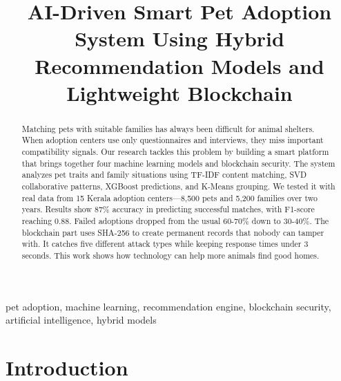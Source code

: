 \documentclass[conference]{IEEEtran}
\begin{document}
\title{AI-Driven Smart Pet Adoption System Using Hybrid Recommendation Models and Lightweight Blockchain}

\author{
\and
{}
}

\maketitle

\begin{abstract}
Matching pets with suitable families has always been difficult for animal shelters. When adoption centers use only questionnaires and interviews, they miss important compatibility signals. Our research tackles this problem by building a smart platform that brings together four machine learning models and blockchain security. The system analyzes pet traits and family situations using TF-IDF content matching, SVD collaborative patterns, XGBoost predictions, and K-Means grouping. We tested it with real data from 15 Kerala adoption centers—8,500 pets and 5,200 families over two years. Results show 87\% accuracy in predicting successful matches, with F1-score reaching 0.88. Failed adoptions dropped from the usual 60-70\% down to 30-40\%. The blockchain part uses SHA-256 to create permanent records that nobody can tamper with. It catches five different attack types while keeping response times under 3 seconds. This work shows how technology can help more animals find good homes.
\end{abstract}

\begin{IEEEkeywords}
pet adoption, machine learning, recommendation engine, blockchain security, artificial intelligence, hybrid models
\end{IEEEkeywords}

\section{Introduction}
\end{document}
